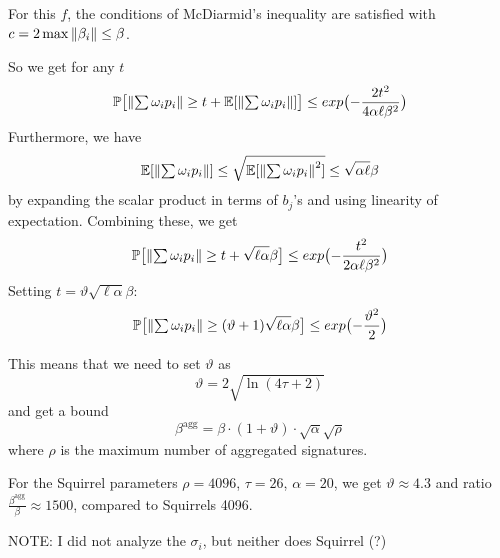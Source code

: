 \documentclass{article}
\renewcommand{\PROB}{\mathbb{P}}
\renewcommand{\EXPECT}{\mathbb{E}}
\begin{document}
For this $f$, the conditions of McDiarmid's inequality are satisfied with $c = 2\max{{\lVert{\beta_i}\rVert}} \leq \beta$.

So we get for any $t$
\[
 \PROB\bigl[\norm{\textstyle\sum\omega_i p_i} \geq t + \EXPECT[\norm{\textstyle\sum \omega_i p_i}] \bigr]  \leq \mathop{exp}\bigl(
 -\frac{2t^2}{4\alpha \ell \beta^2}
 \bigr)
\]
Furthermore, we have
\[
 \EXPECT[\norm{\textstyle\sum \omega_i p_i}] \leq \sqrt{\EXPECT[\norm{\textstyle\sum \omega_i p_i}^2]} \leq \sqrt{\alpha\ell}\beta
\]
by expanding the scalar product in terms of $b_j$'s and using linearity of expectation.
Combining these, we get
\[
 \PROB\bigl[\norm{\textstyle\sum\omega_i p_i} \geq t + \sqrt{\ell\alpha}\beta \bigr]  \leq \mathop{exp}\bigl(
 -\frac{t^2}{2\alpha \ell \beta^2}
 \bigr)
\]
Setting $t = \vartheta\sqrt{\ell\alpha}\beta$:
\[
 \PROB\bigl[\norm{\textstyle\sum\omega_i p_i} \geq (\vartheta + 1) \sqrt{\ell\alpha}\beta \bigr]  \leq \mathop{exp}\bigl(
 -\frac{\vartheta^2}{2}
 \bigr)
\]

This means that we need to set $\vartheta$ as
\[
 \vartheta = 2\sqrt{\mathop{ln}(4\tau+2)}
\]
and get a bound
\[
 \beta^{\textrm{agg}} = \beta \cdot (1+\vartheta)\cdot \sqrt{\alpha} \sqrt{\rho}
\]
where $\rho$ is the maximum number of aggregated signatures.

For the Squirrel parameters $\rho = 4096$, $\tau = 26$, $\alpha = 20$, we get $\vartheta \approx 4.3$ and ratio $\frac{\beta^{\textrm{agg}}}{\beta} \approx 1500$, compared to Squirrels 4096.

NOTE: I did not analyze the $\sigma_i$, but neither does Squirrel (?)
\end{document}
